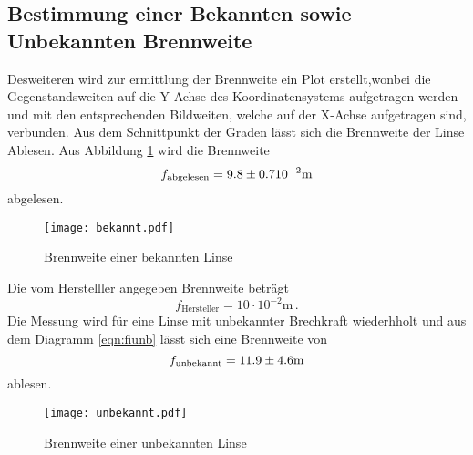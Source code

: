 \subsection{Bestimmung einer Bekannten sowie Unbekannten Brennweite}
Desweiteren wird zur ermittlung der Brennweite ein Plot erstellt,wonbei die Gegenstandsweiten auf die Y-Achse des Koordinatensystems aufgetragen werden und mit den entsprechenden Bildweiten, welche auf der X-Achse aufgetragen sind, verbunden. Aus dem Schnittpunkt der Graden lässt sich die Brennweite der Linse Ablesen. Aus Abbildung \ref{fig:fibek} wird die Brennweite
\begin{equation}
  f_\text{abgelesen} = \num{9.8 +- 0.7} 10^{-2} \text{m}
  \label{eqn:fbek}
\end{equation} abgelesen. 
\begin{figure}
  \centering
  \texttt{[image: bekannt.pdf]}
  \caption{Brennweite einer bekannten Linse}
  \label{fig:fibek}
\end{figure}
Die vom Herstelller angegeben Brennweite beträgt 
\begin{equation}
  f_\text{Hersteller} = 10\cdot10^{-2} \text{m} \, .
  \label{eqn:fHer}
\end{equation}
Die Messung wird für eine Linse mit unbekannter Brechkraft wiederhholt und aus dem Diagramm \ref{eqn:fiunb} lässt sich eine Brennweite von 
\begin{equation}
  f_\text{unbekannt} = \num{11.9 +- 4.6} \text{m}
  \label{eqn:unb}
\end{equation}
ablesen.
\begin{figure}
  \centering
  \texttt{[image: unbekannt.pdf]}
  \caption{Brennweite einer unbekannten Linse}
  \label{fig:fiunb}
\end{figure}

